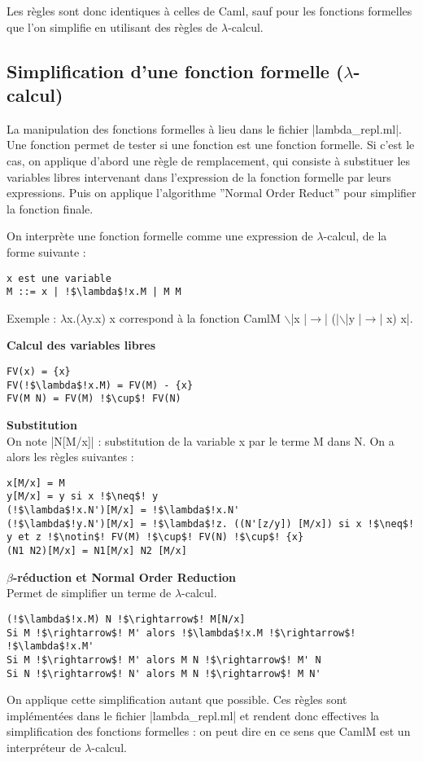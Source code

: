 \documentclass[a4paper, 12pt]{article}
\begin{document}
Les règles sont donc identiques à celles de Caml, sauf pour les fonctions formelles que l'on simplifie en utilisant des règles de $\lambda$-calcul.

\subsection{Simplification d'une fonction formelle ($\lambda$-calcul)}
\label{lambdacalcul}
La manipulation des fonctions formelles à lieu dans le fichier |lambda_repl.ml|.
Une fonction permet de tester si une fonction est une fonction formelle. Si c'est le cas, on applique d'abord une règle de remplacement, qui consiste à substituer les variables libres intervenant dans l'expression de la fonction formelle par leurs expressions.
Puis on applique l'algorithme ''Normal Order Reduct'' pour simplifier la fonction finale.


On interprète une fonction formelle comme une expression de $\lambda$-calcul, de la forme suivante : 
\begin{lstlisting}
x est une variable
M ::= x | !$\lambda$!x.M | M M
\end{lstlisting}

Exemple : 
$\lambda$x.($\lambda$y.x) x correspond à la fonction CamlM $\backslash$|x |$\rightarrow$| (|$\backslash$|y |$\rightarrow$| x) x|.

\textbf{Calcul des variables libres}
\begin{lstlisting}
FV(x) = {x}
FV(!$\lambda$!x.M) = FV(M) - {x}
FV(M N) = FV(M) !$\cup$! FV(N)
\end{lstlisting}
\newpage
\textbf{Substitution}\\
On note |N[M/x]| : substitution de la variable x par le terme M dans N. 
On a alors les règles suivantes : 
\begin{lstlisting}
x[M/x] = M
y[M/x] = y si x !$\neq$! y
(!$\lambda$!x.N')[M/x] = !$\lambda$!x.N'
(!$\lambda$!y.N')[M/x] = !$\lambda$!z. ((N'[z/y]) [M/x]) si x !$\neq$! y et z !$\notin$! FV(M) !$\cup$! FV(N) !$\cup$! {x}
(N1 N2)[M/x] = N1[M/x] N2 [M/x]
\end{lstlisting}

\textbf{$\beta$-réduction et Normal Order Reduction}\\
Permet de simplifier un terme de $\lambda$-calcul.
\begin{lstlisting}
(!$\lambda$!x.M) N !$\rightarrow$! M[N/x]
Si M !$\rightarrow$! M' alors !$\lambda$!x.M !$\rightarrow$! !$\lambda$!x.M'
Si M !$\rightarrow$! M' alors M N !$\rightarrow$! M' N
Si N !$\rightarrow$! N' alors M N !$\rightarrow$! M N'
\end{lstlisting}
On applique cette simplification autant que possible.
Ces règles sont implémentées dans le fichier |lambda_repl.ml| et rendent donc effectives la simplification des fonctions formelles : on peut dire en ce sens que CamlM est un interpréteur de $\lambda$-calcul.
\end{document}
